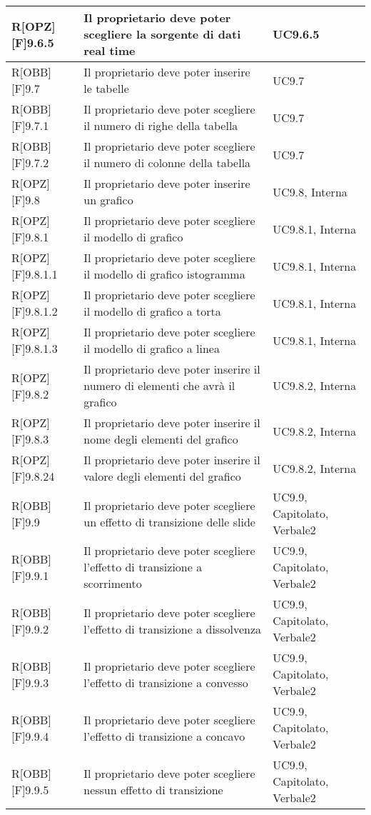 	\newpage
	
	\begin{table}[h]
		\begin{tabular}{|p{}|p{}|p{}|}
			\midrule

			R[OPZ][F]9.6.5 & Il proprietario deve poter scegliere la sorgente di dati real time & UC9.6.5 \\ \midrule
			R[OBB][F]9.7 & Il proprietario deve poter inserire le tabelle & UC9.7 \\ \midrule
			R[OBB][F]9.7.1 & Il proprietario deve poter scegliere il numero di righe della tabella & UC9.7 \\ \midrule
			R[OBB][F]9.7.2 & Il proprietario deve poter scegliere il numero di colonne della tabella & UC9.7 \\ \midrule
			R[OPZ][F]9.8 & Il proprietario deve poter inserire un grafico & UC9.8, Interna \\ \midrule
			R[OPZ][F]9.8.1 & Il proprietario deve poter scegliere il modello di grafico & UC9.8.1, Interna \\ \midrule
			R[OPZ][F]9.8.1.1 & Il proprietario deve poter scegliere il modello di grafico istogramma & UC9.8.1, Interna \\ \midrule
			R[OPZ][F]9.8.1.2 & Il proprietario deve poter scegliere il modello di grafico a torta & UC9.8.1, Interna \\ \midrule
			R[OPZ][F]9.8.1.3 & Il proprietario deve poter scegliere il modello di grafico a linea & UC9.8.1, Interna \\ \midrule
			R[OPZ][F]9.8.2 & Il proprietario deve poter inserire il numero di elementi che avrà il grafico & UC9.8.2, Interna \\ \midrule
			R[OPZ][F]9.8.3 & Il proprietario deve poter inserire il nome degli elementi del grafico  & UC9.8.2, Interna \\ \midrule
			R[OPZ][F]9.8.24 & Il proprietario deve poter inserire il valore degli elementi del grafico & UC9.8.2, Interna \\ \midrule
			R[OBB][F]9.9 & Il proprietario deve poter scegliere un effetto di transizione delle \gls{slide} & UC9.9, Capitolato, Verbale2 \\ \midrule
			R[OBB][F]9.9.1 & Il proprietario deve poter scegliere l'effetto di transizione a scorrimento & UC9.9, Capitolato, Verbale2 \\ \midrule
			R[OBB][F]9.9.2 & Il proprietario deve poter scegliere l'effetto di transizione a dissolvenza & UC9.9, Capitolato, Verbale2 \\ \midrule
			R[OBB][F]9.9.3 & Il proprietario deve poter scegliere l'effetto di transizione a convesso & UC9.9, Capitolato, Verbale2 \\ \midrule
			R[OBB][F]9.9.4 & Il proprietario deve poter scegliere l'effetto di transizione a concavo & UC9.9, Capitolato, Verbale2 \\ \midrule
			R[OBB][F]9.9.5 & Il proprietario deve poter scegliere nessun effetto di transizione & UC9.9, Capitolato, Verbale2 \\ \midrule

		\end{tabular}
	\end{table}
	\newpage
	
